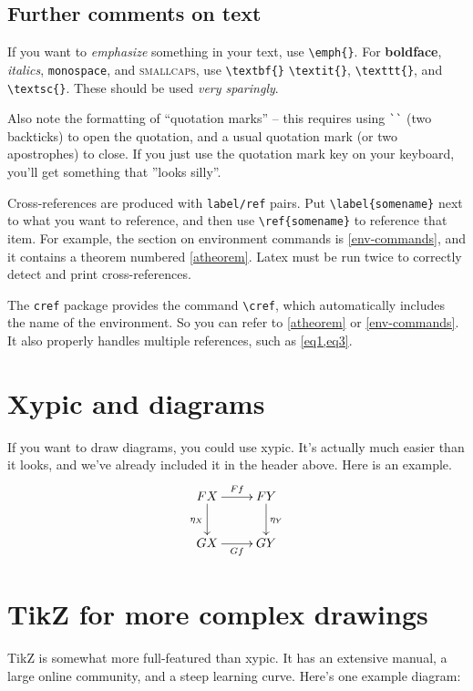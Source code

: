 \documentclass[11pt,oneside,draft]{amsart}
\numberwithin{equation}{section} %
\numberwithin{figure}{section} %
\theoremstyle{plain} %
\theoremstyle{definition} %
\theoremstyle{remark} %
\begin{document}
\subsection{Further comments on text}

If you want to \emph{emphasize} something in your text, use
\verb|\emph{}|.  For \textbf{boldface}, \textit{italics},
\texttt{monospace}, and \textsc{smallcaps}, use \verb|\textbf{}|
\verb|\textit{}|, \verb|\texttt{}|, and \verb|\textsc{}|.  These
should be used \emph{very sparingly}.  

Also note the formatting of ``quotation marks'' -- this requires using
\verb|``| (two backticks) to open the quotation, and a usual quotation
mark (or two apostrophes) to close.  If you just use the quotation
mark key on your keyboard, you'll get something that ''looks silly''.

Cross-references are produced with \texttt{label/ref} pairs.  Put
\verb|\label{somename}| next to what you want to reference, and then
use \verb|\ref{somename}| to reference that item.  For example, the
section on environment commands is \ref{env-commands}, and it contains
a theorem numbered \ref{atheorem}.  Latex must be run twice to
correctly detect and print cross-references.

The \texttt{cref} package provides the command \verb|\cref|, which
automatically includes the name of the environment.  So you can
refer to \cref{atheorem} or \cref{env-commands}.  It also
properly handles multiple references, such as \cref{eq1,eq3}.

\section{Xypic and diagrams}

If you want to draw diagrams, you could use xypic.  It's actually
much easier than it looks, and we've already included it in the header
above.  Here is an example. 
\[\xymatrix{
FX \ar[r]^-{Ff} \ar[d]_{\eta_X} & FY \ar[d]^{\eta_Y} \\
GX \ar[r]_-{Gf} & GY\\} \]

\section{TikZ for more complex drawings}

TikZ is somewhat more full-featured than xypic.  It has an extensive
manual, a large online community, and a steep learning curve.  Here's one
example diagram:
\end{document}
